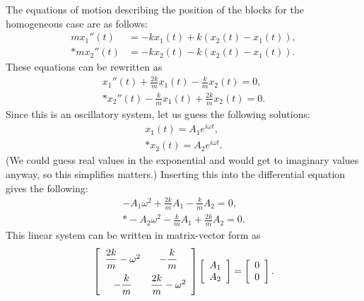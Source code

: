 The equations of motion describing the position of the blocks for the homogeneous case are as follows:
\begin{subequations}
\begin{align}
  m x_1''(t) &= -k x_1(t) + k ( x_2(t) - x_1(t) ), \\*
  m x_2''(t) &= -k x_2(t) - k ( x_2(t) - x_1(t) ).
\end{align}
\end{subequations}
These equations can be rewritten as
\begin{subequations}
\begin{align}
  x_1''(t) + \frac{2k}{m} x_1(t) -  \frac{k}{m} x_2(t) = 0, \\*
  x_2''(t) -  \frac{k}{m} x_1(t) + \frac{2k}{m} x_2(t) = 0.
\end{align}
\end{subequations}
Since this is an oscillatory system, let us guess the following solutions:
\begin{subequations}
\begin{align}
  x_1(t) = A_1 e^{i \omega t}, \\*
  x_2(t) = A_2 e^{i \omega t}.
\end{align}
\end{subequations}
(We could guess real values in the exponential and would get to imaginary values anyway, so this simplifies matters.) Inserting this into the differential equation gives the following:
\begin{align}
  -A_1 \omega^2 + \frac{2k}{m} A_1 -  \frac{k}{m} A_2 = 0, \\*
  -A_2 \omega^2 -  \frac{k}{m} A_1 + \frac{2k}{m} A_2 = 0.
\end{align}
This linear system can be written in matrix-vector form as
\begin{align}
  \left[ \begin{array}{c c}
  \dfrac{2k}{m} - \omega^2 & -\dfrac{k}{m} \vspace{0.2cm} \\
  -\dfrac{k}{m}            & \dfrac{2k}{m} - \omega^2 \\ \end{array} \right]
  \left[ \begin{array}{c} A_1 \\ A_2 \\ \end{array} \right] =
  \left[ \begin{array}{c} 0 \\ 0 \\ \end{array} \right] .
\end{align}
